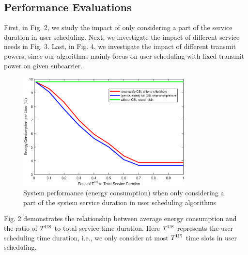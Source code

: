 \documentclass[conference]{IEEEtran}
\begin{document}
 
 \subsection{Performance Evaluations}
 
 First, in Fig. 2, we study the impact of only considering a part of the service duration in user scheduling. 
 Next, we investigate the impact of different service needs in Fig. 3. 
 Last, in Fig. 4, we investigate the impact of different transmit powers, since our algorithms mainly focus on user scheduling with fixed transmit power on given subcarrier. 
 
 
 \begin{figure} [htb]
 \begin{center}
 \includegraphics*[width=8.8cm]{Tranges.eps}
 \end{center}
 \vspace*{-4mm} 
 \caption{System performance (energy consumption) when only considering a part of the system service duration in user scheduling algorithms} \label{fig:2}
 \vspace*{-2mm} 
 \end{figure}
 
 
 Fig. 2 demonstrates the relationship between average energy consumption and the ratio of ${T^{\rm{US}}}$ to total service time duration. Here ${T^{\rm{US}}}$ represents the user scheduling time duration, i.e., we only consider at most $T^{\rm{US}}$ time slots in user scheduling. %
 
\end{document}
